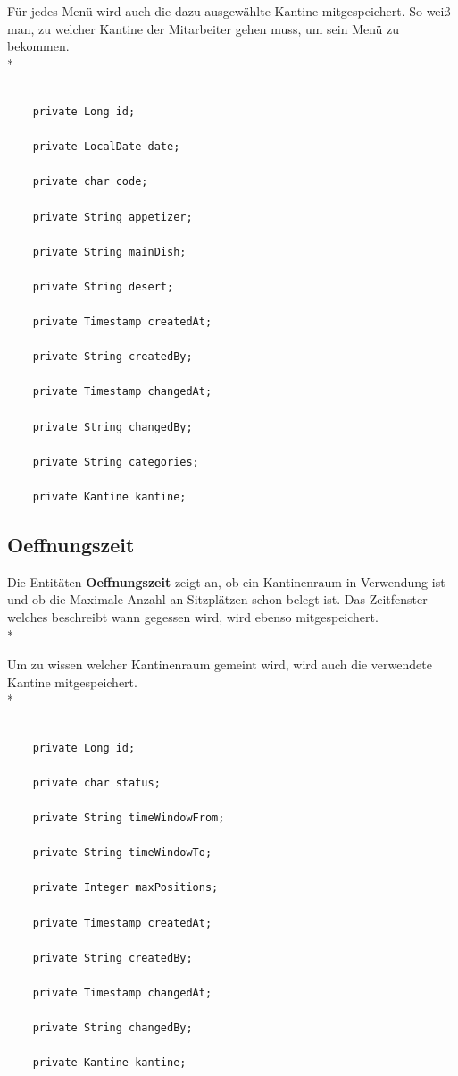 Für jedes Menü wird auch die dazu ausgewählte Kantine mitgespeichert. So weiß man, zu welcher Kantine der Mitarbeiter gehen muss, um sein Menü zu bekommen. \\*

\begin{lstlisting}

    private Long id;

    private LocalDate date;

    private char code;

    private String appetizer;

    private String mainDish;

    private String desert;

    private Timestamp createdAt;

    private String createdBy;

    private Timestamp changedAt;

    private String changedBy;

    private String categories;

    private Kantine kantine;
\end{lstlisting}

\pagebreak

\subsection{Oeffnungszeit}

Die Entitäten \textbf{Oeffnungszeit} zeigt an, ob ein Kantinenraum in Verwendung ist und ob die Maximale Anzahl an Sitzplätzen schon belegt ist. 
Das Zeitfenster welches beschreibt wann gegessen wird, wird ebenso mitgespeichert. \\*

Um zu wissen welcher Kantinenraum gemeint wird, wird auch die verwendete Kantine mitgespeichert. \\*

\begin{lstlisting}

    private Long id;

    private char status;

    private String timeWindowFrom;

    private String timeWindowTo;

    private Integer maxPositions;

    private Timestamp createdAt;

    private String createdBy;

    private Timestamp changedAt;

    private String changedBy;

    private Kantine kantine;
\end{lstlisting}

